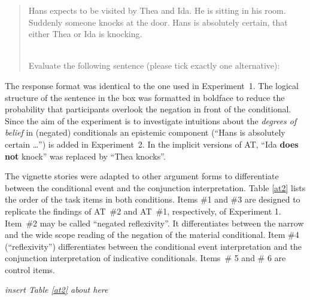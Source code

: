 \documentclass[11pt]{article}
\begin{document}
\begin{quote}
\footnotesize
\noindent
Hans expects to be visited by Thea and Ida. He is sitting in his room. Suddenly
someone knocks at the door. Hans is absolutely certain, that either
Thea or Ida is knocking.



~\\
Evaluate the following sentence (please tick exactly one alternative):

\begin{center}

\end{center}
\end{quote}
\normalsize The response format was identical to the one used in
Experiment~1. The logical structure of the sentence in the box was
formatted in boldface to reduce the probability that participants
overlook the negation in front of the conditional. Since the aim of
the experiment is to investigate intuitions about the \emph{degrees of
  belief} in (negated) conditionals an epistemic component (``Hans is
absolutely certain \dots'') is added in Experiment~2. In the implicit
versions of AT, ``Ida {\bf does not} knock'' was replaced by ``Thea
knocks''.

The vignette stories were adapted to other argument forms to
differentiate between the conditional event and the conjunction
interpretation.  Table \ref{at2} lists the order of the task items in
both conditions. Items \#1 and \#3 are designed to replicate the
findings of AT~\#2 and AT~\#1, respectively, of Experiment
1. Item~\#2 may be called ``negated reflexivity''. It differentiates
between the narrow and the wide scope reading of the negation of the material
conditional. Item \#4 (``reflexivity'') differentiates between the
conditional event interpretation and the conjunction interpretation of
indicative conditionals. Items~\# 5 and \# 6 are control items.


\dotfill

\dotfill \emph{insert Table
\ref{at2} about here} \dotfill

\dotfill
\end{document}
